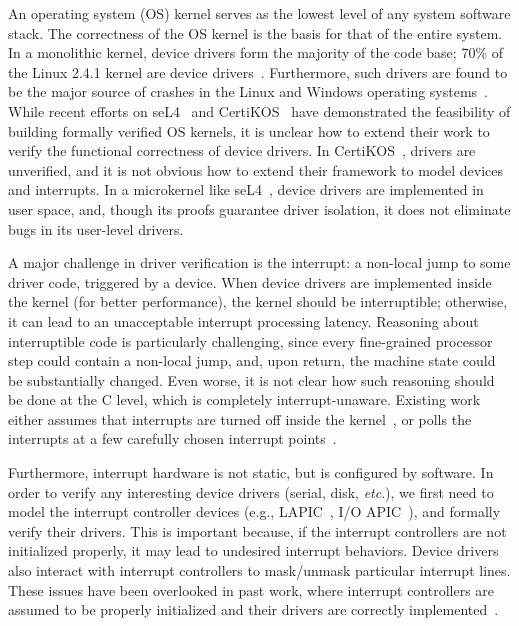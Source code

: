 An operating system (OS) kernel serves as the lowest level of any
system software stack. The correctness of the OS kernel is the basis
for that of the entire system. In a monolithic kernel, device drivers
form the majority of the code base; 70\% of the Linux 2.4.1 kernel are
device drivers~\cite{Chou:2001}. Furthermore, such drivers are found
to be the major source of crashes in the Linux and Windows operating
systems~\cite{Chou:2001,Ball:2006,Ganapathi:2006}. While recent
efforts on seL4~\cite{klein14} and CertiKOS~\cite{dscal15} have
demonstrated the feasibility of building formally verified OS kernels,
it is unclear how to extend their work to verify the functional
correctness of device drivers. In CertiKOS~\cite{dscal15}, drivers are
unverified, and it is not obvious how to extend their framework to
model devices and interrupts. In a microkernel like
seL4~\cite{klein14}, device drivers are implemented in user space,
and, though its proofs guarantee driver isolation, it does not
eliminate bugs in its user-level drivers.

A major challenge in driver verification is the interrupt: a non-local
jump to some driver code, triggered by a device. When device drivers
are implemented inside the kernel (for better performance), the kernel
should be interruptible; otherwise, it can lead to an unacceptable
interrupt processing latency.  Reasoning about interruptible code is
particularly challenging, since every fine-grained processor step
could contain a non-local jump, and, upon return, the machine state
could be substantially changed. Even worse, it is not clear how such
reasoning should be done at the C level, which is completely
interrupt-unaware. Existing work either assumes that interrupts are
turned off inside the kernel~\cite{dscal15,verisoft07}, or polls the
interrupts at a few carefully chosen interrupt points~\cite{klein14}.

Furthermore, interrupt hardware is not static, but is configured by
software. In order to verify any interesting device drivers (serial,
disk, {\it etc}.), we first need to model the interrupt controller
devices (e.g., LAPIC~\cite{mps97}, I/O APIC~\cite{ioapicd96}), and
formally verify their drivers. This is important because, if the
interrupt controllers are not initialized properly, it may lead to
undesired interrupt behaviors. Device drivers also interact with
interrupt controllers to mask/unmask particular interrupt lines.
These issues have been overlooked in past work, where 
interrupt controllers are assumed to be properly initialized and
their drivers are correctly implemented~\cite{Alkassar:VSTTE08-225}.

